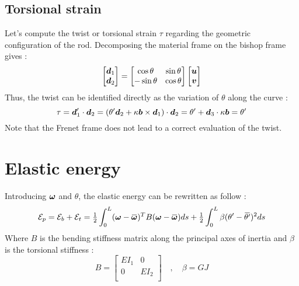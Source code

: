 \subsection{Torsional strain}
Let's compute the twist or torsional strain $\tau$ regarding the geometric configuration of the rod. Decomposing the material frame on the bishop frame gives :
\begin{equation}
	\begin{bmatrix}
		\boldsymbol{d}_1\\
		\boldsymbol{d}_2\\
	\end{bmatrix} =
		\begin{bmatrix}
		\cos{\theta} & \sin{\theta}\\
		-\sin{\theta} & \cos{\theta}\\
	\end{bmatrix}
	\begin{bmatrix}
		\boldsymbol{u}\\
		\boldsymbol{v}\\
	\end{bmatrix}
\end{equation}
Thus, the twist can be identified directly as the variation of $\theta$ along the curve :
\begin{equation}
	\tau = \boldsymbol{d}'_1 \cdot \boldsymbol{d}_2 = (\theta'\boldsymbol{d}_2 + \kappa\boldsymbol{b}\times\boldsymbol{d}_1)\cdot \boldsymbol{d}_2 = \theta' + \boldsymbol{d}_3\cdot\kappa\boldsymbol{b} = \theta'
\end{equation}
Note that the Frenet frame does not lead to a correct evaluation of the twist.

\section{Elastic energy}
Introducing $\boldsymbol{\omega}$ and $\theta$, the elastic energy can be rewritten as follow :
\begin{equation}
		\mathcal{E}_{p} = \mathcal{E}_{b} + \mathcal{E}_{t} =
		\tfrac{1}{2} \int_{0}^{L} (\vect{\omega}-\overbar{\vect{\omega}})^T B (\vect{\omega}-\overbar{\vect{\omega}}) ds
		+ \tfrac{1}{2} \int_{0}^{L} \beta(\theta' -{\overbar{\theta'}})^2 ds
\end{equation}
Where $B$ is the bending stiffness matrix along the principal axes of inertia and $\beta$ is the torsional stiffness :
\begin{equation}
	B = \begin{bmatrix}
			EI_1	&	0\\
			0	&	EI_2\\
		\end{bmatrix}
	\quad,\quad
	\beta = GJ
\end{equation}

